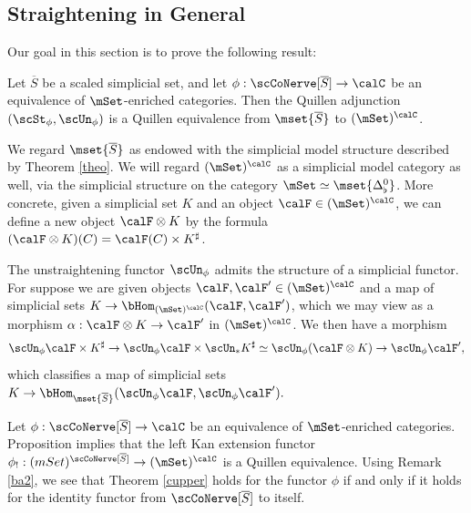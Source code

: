 \subsection{Straightening in General}\label{bisec3.6}

Our goal in this section is to prove the following result:

\begin{theorem}\label{cupper}
Let $\overline{S}$ be a scaled simplicial set, and let $\phi: \scCoNerve[ \overline{S} ] \rightarrow \calC$ be an equivalence of $\mSet$-enriched categories. Then the Quillen adjunction $( \scSt_{\phi}, \scUn_{\phi})$ is a Quillen equivalence
from $\mset{ \overline{S} }$ to $(\mSet)^{\calC}$.
\end{theorem}

\begin{remark}\label{jul2}
We regard $\mset{ \overline{S} }$ as endowed with the simplicial model structure described
by Theorem \ref{theo}. We will regard $(\mSet)^{\calC}$ as a simplicial model
category as well, via the simplicial structure on the category $\mSet \simeq \mset{ \Delta^0_{\flat}}$. More concrete, given a simplicial set $K$ and an object $\calF \in (\mSet)^{\calC}$, we can define a new object $\calF \otimes K$ by the formula $(\calF \otimes K)(C)
= \calF(C) \times K^{\sharp}$.

The unstraightening functor $\scUn_{\phi}$ admits the structure of a simplicial functor. For suppose we are given objects $\calF, \calF' \in (\mSet)^{\calC}$ and a map
of simplicial sets $K \rightarrow \bHom_{ (\mSet)^{\calC}}( \calF, \calF' )$, which we may view as a morphism $\alpha: \calF \otimes K \rightarrow \calF'$ in $(\mSet)^{\calC}$. We then have a morphism
$$ \scUn_{\phi} \calF \times K^{\sharp}
\rightarrow \scUn_{\phi} \calF \times \scUn_{\ast} K^{\sharp}
\simeq \scUn_{\phi}( \calF \otimes K)
\rightarrow \scUn_{\phi} \calF',$$
which classifies a map of simplicial sets
$K \rightarrow \bHom_{ \mset{ \overline{S} }}( \scUn_{\phi} \calF,
\scUn_{\phi} \calF' ).$
\end{remark}

\begin{remark}\label{jul1}
Let $\phi: \scCoNerve[ \overline{S} ] \rightarrow \calC$ be an equivalence of
$\mSet$-enriched categories.
Proposition  implies that the left Kan extension functor
$\phi_{!}: (mSet)^{ \scCoNerve[ \overline{S} ]} \rightarrow (\mSet)^{\calC}$ is
a Quillen equivalence. Using Remark \ref{ba2}, we see that Theorem \ref{cupper}
holds for the functor $\phi$ if and only if it holds for the identity functor
from $\scCoNerve[ \overline{S} ]$ to itself.
\end{remark}

